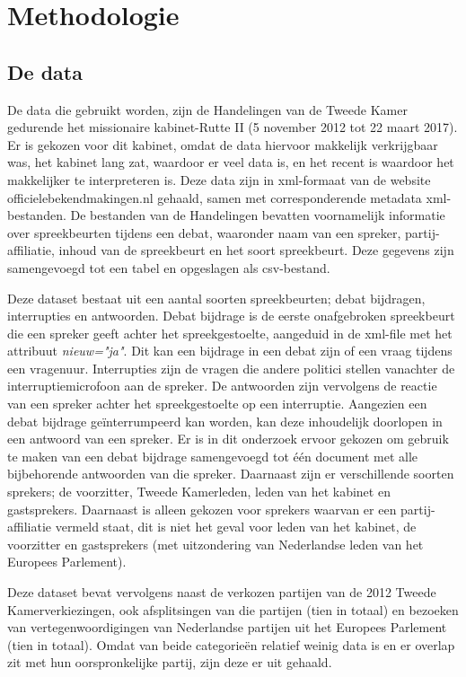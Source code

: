 \section{Methodologie}
\label{sec:meth}


\subsection{De data}
\label{data}
De data die gebruikt worden, zijn de Handelingen van de Tweede Kamer gedurende het missionaire kabinet-Rutte II (5 november 2012 tot 22 maart 2017). Er is gekozen voor dit kabinet, omdat de data hiervoor makkelijk verkrijgbaar was, het kabinet lang zat, waardoor er veel data is, en het recent is waardoor het makkelijker te interpreteren is. Deze data zijn in xml-formaat van de website officielebekendmakingen.nl gehaald, samen met corresponderende metadata xml-bestanden. De bestanden van de Handelingen bevatten voornamelijk informatie over spreekbeurten tijdens een debat, waaronder naam van een spreker, partij-affiliatie, inhoud van de spreekbeurt en het soort spreekbeurt. Deze gegevens zijn samengevoegd tot een tabel en opgeslagen als csv-bestand.\par
Deze dataset bestaat uit een aantal soorten spreekbeurten; debat bijdragen, interrupties en antwoorden. Debat bijdrage is de eerste onafgebroken spreekbeurt die een spreker geeft achter het spreekgestoelte, aangeduid in de xml-file met het attribuut \textit{nieuw="ja"}. Dit kan een bijdrage in een debat zijn of een vraag tijdens een vragenuur. Interrupties zijn de vragen die andere politici stellen vanachter de interruptiemicrofoon aan de spreker. De antwoorden zijn vervolgens de reactie van een spreker achter het spreekgestoelte op een interruptie. Aangezien een debat bijdrage geïnterrumpeerd kan worden, kan deze inhoudelijk doorlopen in een antwoord van een spreker. Er is in dit onderzoek ervoor gekozen om gebruik te maken van een debat bijdrage samengevoegd tot één document met alle bijbehorende antwoorden van die spreker. Daarnaast zijn er verschillende soorten sprekers; de voorzitter, Tweede Kamerleden, leden van het kabinet en gastsprekers.  Daarnaast is alleen gekozen voor sprekers waarvan er een partij-affiliatie vermeld staat, dit is niet het geval voor leden van het kabinet, de voorzitter en gastsprekers  (met uitzondering van Nederlandse leden van het Europees Parlement).\par
Deze dataset bevat vervolgens naast de verkozen partijen van de 2012 Tweede Kamerverkiezingen, ook afsplitsingen van die partijen (tien in totaal) en bezoeken van vertegenwoordigingen van Nederlandse partijen uit het Europees Parlement (tien in totaal). Omdat van beide categorieën relatief weinig data is en er overlap zit met hun oorspronkelijke partij, zijn deze er uit gehaald. \par


